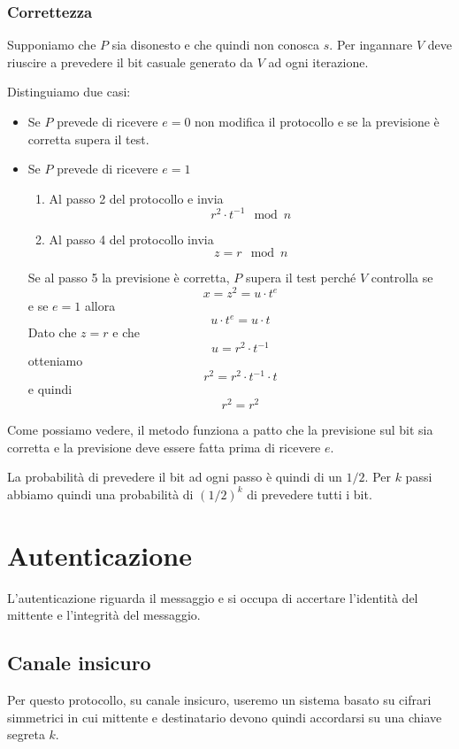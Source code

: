 \subsubsection{Correttezza}
Supponiamo che $P$ sia disonesto e che quindi non conosca $s$. Per ingannare $V$ deve riuscire a prevedere il bit
casuale generato da $V$ ad ogni iterazione.

Distinguiamo due casi:
\begin{itemize}
	\item Se $P$ prevede di ricevere $e = 0$ non modifica il protocollo e se la previsione \`e corretta supera il
	      test.
	\item Se $P$ prevede di ricevere $e = 1$
	      \begin{enumerate}
		      \item Al passo 2 del protocollo e invia
		            \[ r^2 \cdot t^{-1} \mod{n} \]
		      \item Al passo 4 del protocollo invia
		            \[ z = r \mod{n} \]
	      \end{enumerate}
	      Se al passo 5 la previsione \`e corretta, $P$ supera il test perch\'e $V$ controlla se
	      \[ x = z^2 = u \cdot t^e \]
	      e se $e = 1$ allora
	      \[ u \cdot t^e = u \cdot t \]
	      Dato che $z = r$ e che
	      \[ u = r^2 \cdot t^{-1} \]
	      otteniamo
	      \[ r^2 = r^2 \cdot t^{-1} \cdot t \]
	      e quindi
	      \[ r^2 = r^2 \]
\end{itemize}
Come possiamo vedere, il metodo funziona a patto che la previsione sul bit sia corretta e la previsione deve essere
fatta prima di ricevere $e$.

La probabilit\`a di prevedere il bit ad ogni passo \`e quindi di un $1/2$. Per $k$ passi abbiamo quindi una
probabilit\`a di $(1/2)^k$ di prevedere tutti i bit.

\section{Autenticazione}
L'autenticazione riguarda il messaggio e si occupa di accertare l'identit\`a del mittente e l'integrit\`a del
messaggio.

\subsection{Canale insicuro}
Per questo protocollo, su canale insicuro, useremo un sistema basato su cifrari simmetrici in cui mittente e
destinatario devono quindi accordarsi su una chiave segreta $k$.

